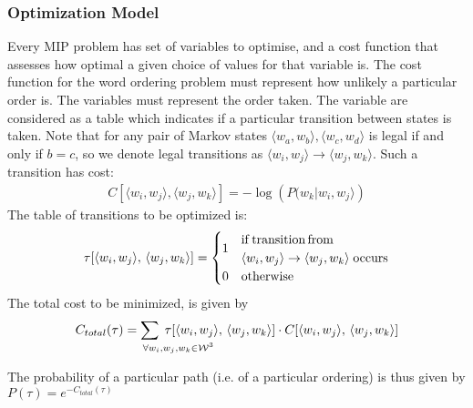 \documentclass[twocolumn]{article}
\begin{document}
\subsubsection{Optimization Model}
Every MIP problem has set of variables to optimise, and a cost function that assesses how optimal a given choice of values for that variable is. The cost function for the word ordering problem must represent how unlikely a particular order is. The variables must represent the order taken. The variable are considered as a table which indicates if a particular transition between states is taken. Note that for any pair of Markov states $\langle w_{a},w_{b}\rangle,\langle w_{c},w_{d}\rangle$ is legal if and only if $b=c$, so we denote legal transitions as $\langle w_{i},w_{j}\rangle \to \langle w_{j},w_{k}\rangle$.
%
Such a transition has cost:
\begin{gather*}
	C[\langle w_{i},w_{j}\rangle,\langle w_{j},w_{k}\rangle]=-\log\left(P(w_{k}|w_{i},w_{j}\rangle\right)
\end{gather*} 
%
The table of transitions to be optimized is:
\displayunskip
\begin{gather*}
 \tau[\langle w_{i},w_{j}\rangle,\,\langle w_{j},w_{k}\rangle] = %
 \begin{cases}
	 \multirow{2}{*}{1} & \mathrm{if\,transition\,from} \\
	 	                & \langle w_{i},w_{j}\rangle \to \langle w_{j},w_{k}\rangle
	 	                   \;\mathrm{ occurs} \\
                     0  & \mathrm{otherwise}
  \end{cases}
\end{gather*}
%
The total cost to be minimized, is given by
\displayunskip
\begin{gather*}
 C_{total}(\tau)= \sum_{\mathrlap{\!\!\!\!\forall w_i,w_j,w_k \in \W^{3}
 	}}
 	\;\tau[\langle w_{i},w_{j}\rangle,\,\langle w_{j},w_{k}\rangle] \cdot C[\langle w_{i},w_{j}\rangle,\,\langle w_{j},w_{k}\rangle]
\end{gather*}


The probability of a particular path (i.e. of a particular ordering)
is thus given by $P(\tau)=e^{-C_{total}(\tau)}$
\end{document}
